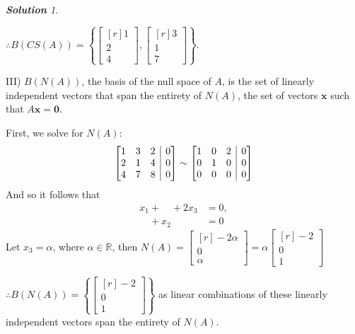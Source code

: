 \documentclass[12pt, letterpaper]{article}
\makeatletter
\theoremstyle{remark}
\theoremstyle{remark}
\newtheorem*{solution}{\textbf{Solution}}
\newenvironment{amatrix}[1]{%
    \left[\begin{array}{@{}*{#1}{c}|c@{}}
    }{%
        \end{array}\right]
    }
\makeatother
\begin{document}
\begin{solution}
\begin{enumerate}[(a)]
		      \(\therefore B(CS(A)) = \left \{\begin{bmatrix*}[r]
			      1 \\
			      2 \\
			      4
		      \end{bmatrix*}, \begin{bmatrix*}[r]
			      3 \\
			      1 \\
			      7
		      \end{bmatrix*} \right \}.\)

		      \bigskip

		      III) \(B(N(A))\), the basis of the null space of $A$, is
		      the set of linearly independent vectors that span the entirety of
		      \(N(A)\), the set of vectors \(\bm{x}\) such that \(A\bm{x}=\bm{0}\).

		      First, we solve for \(N(A)\):
		      \[
			      \begin{amatrix}{3}
				      1 & 3 & 2 & 0 \\
				      2 & 1 & 4 & 0 \\
				      4 & 7 & 8 & 0
			      \end{amatrix} \sim
			      \begin{amatrix}{3}
				      1 & 0 & 2 & 0 \\
				      0 & 1 & 0 & 0 \\
				      0 & 0 & 0 & 0
			      \end{amatrix}
		      \]
		      And so it follows that \begin{align*}
			      x_1 + \phantom{x_2} + 2x_3 & = 0, \\
			      \phantom{x_1} + x_2        & = 0
		      \end{align*}
		      Let \(x_3 = \alpha\), where \(\alpha \in \mathbb{R}\),
		      then \(N(A) = \begin{bmatrix*}[r]
			      -2\alpha \\
			      0 \\
			      \alpha
		      \end{bmatrix*} = \alpha\begin{bmatrix*}[r]
			      -2 \\
			      0 \\
			      1
		      \end{bmatrix*}\)

		      \bigskip

		      \(\therefore B(N(A)) = \left\{\begin{bmatrix*}[r]
			      -2 \\
			      0 \\
			      1
		      \end{bmatrix*}\right\}\) as linear combinations of these
		      linearly independent vectors span the entirety of \(N(A)\).


\end{enumerate}
\end{solution}
\end{document}
